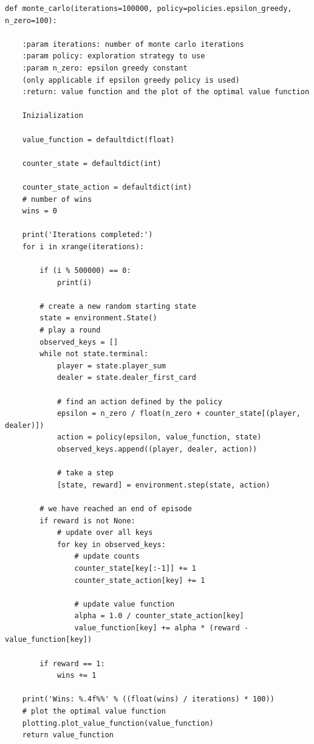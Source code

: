 \documentclass[11pt]{article}
\theoremstyle{plain}
\theoremstyle{definition}
\begin{document}
\begin{lstlisting}
def monte_carlo(iterations=100000, policy=policies.epsilon_greedy, n_zero=100):
   
    :param iterations: number of monte carlo iterations
    :param policy: exploration strategy to use
    :param n_zero: epsilon greedy constant
    (only applicable if epsilon greedy policy is used)
    :return: value function and the plot of the optimal value function
    
    Inizialization
    
    value_function = defaultdict(float)
   
    counter_state = defaultdict(int)
   
    counter_state_action = defaultdict(int)
    # number of wins
    wins = 0

    print('Iterations completed:')
    for i in xrange(iterations):

        if (i % 500000) == 0:
            print(i)

        # create a new random starting state
        state = environment.State()
        # play a round
        observed_keys = []
        while not state.terminal:
            player = state.player_sum
            dealer = state.dealer_first_card

            # find an action defined by the policy
            epsilon = n_zero / float(n_zero + counter_state[(player, dealer)])
            action = policy(epsilon, value_function, state)
            observed_keys.append((player, dealer, action))

            # take a step
            [state, reward] = environment.step(state, action)

        # we have reached an end of episode
        if reward is not None:
            # update over all keys
            for key in observed_keys:
                # update counts
                counter_state[key[:-1]] += 1
                counter_state_action[key] += 1

                # update value function
                alpha = 1.0 / counter_state_action[key]
                value_function[key] += alpha * (reward - value_function[key])

        if reward == 1:
            wins += 1

    print('Wins: %.4f%%' % ((float(wins) / iterations) * 100))
    # plot the optimal value function
    plotting.plot_value_function(value_function)
    return value_function

\end{lstlisting}
\end{document}
